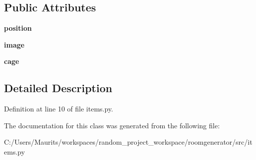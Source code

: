 \subsection*{Public Attributes}
\begin{DoxyCompactItemize}
\item 
\hypertarget{classitems_1_1_static_object_ad3a39d47a2258ad8396507c74f2d1edf}{}{\bfseries position}\label{classitems_1_1_static_object_ad3a39d47a2258ad8396507c74f2d1edf}

\item 
\hypertarget{classitems_1_1_static_object_af2747ca14b5849833742cc596cd487f7}{}{\bfseries image}\label{classitems_1_1_static_object_af2747ca14b5849833742cc596cd487f7}

\item 
\hypertarget{classitems_1_1_static_object_a4e02e721f1d368ef15602bba57ee0912}{}{\bfseries cage}\label{classitems_1_1_static_object_a4e02e721f1d368ef15602bba57ee0912}

\end{DoxyCompactItemize}


\subsection{Detailed Description}


Definition at line 10 of file items.\+py.



The documentation for this class was generated from the following file\+:\begin{DoxyCompactItemize}
\item 
C\+:/\+Users/\+Maurits/workspaces/random\+\_\+project\+\_\+workspace/roomgenerator/src/items.\+py\end{DoxyCompactItemize}
